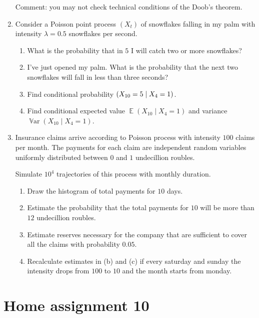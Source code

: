 \documentclass[12pt]{article}
\DeclareMathOperator{\Var}{\mathbb{V}ar}
\let\P\relax
\DeclareMathOperator{\P}{\mathbb{P}}
\DeclareMathOperator{\E}{\mathbb{E}}
\begin{document}
\begin{enumerate}
    Comment: you may not check technical conditions of the Doob's theorem.

    \item Consider a Poisson point process $(X_t)$ of snowflakes falling in my palm with intensity $\lambda = 0.5$ snowflakes per second.
    \begin{enumerate}
        \item What is the probability that in $5$ I will catch two or more snowflakes?
        \item I've just opened my palm. What is the probability that the next two snowflakes will fall in less than three seconds?
        \item Find conditional probability $\P(X_{10} = 5 \mid X_{4} = 1)$.
        \item Find conditional expected value $\E(X_{10} \mid X_{4} = 1)$ and variance $\Var(X_{10} \mid X_4 = 1)$.
    \end{enumerate}
    
    \item Insurance claims arrive according to Poisson process with intensity $100$ claims per month. 
The payments for each claim are independent random variables uniformly distributed between $0$ and $1$ undecillion roubles. 
    
    Simulate $10^4$ trajectories of this process with monthly duration.
    
    \begin{enumerate}
        \item Draw the histogram of total payments for $10$ days. 
        \item Estimate the probability that the total payments for $10$ will be more than $12$ undecillion roubles. 
        \item Estimate reserves necessary for the company that are sufficient to cover all the claims with probability $0.05$.
        \item Recalculate estimates in (b) and (c) if every saturday and sunday the intensity drops from $100$ to $10$ and 
        the month starts from monday. 
    \end{enumerate}
    
\end{enumerate}

\section*{Home assignment 10}
\end{document}
